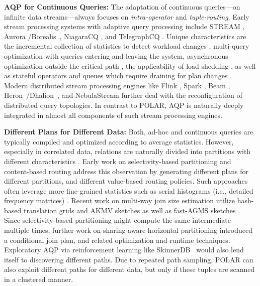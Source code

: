 \textbf{AQP for Continuous Queries:} The adaptation of continuous queries---on infinite data streams---always focuses on \emph{intra-operator} and \emph{tuple-routing}. Early stream processing systems with adaptive query processing include STREAM \cite{BabuW04}, Aurora \cite{AbadiCCCCLSTZ03}/Borealis~\cite{AbadiABCCHLMRRTXZ05}, NiagaraCQ \cite{ChenJDTW00}, and TelegraphCQ \cite{ChandrasekaranDFHHKMRRS03}. Unique characteristics are the incremental collection of statistics to detect workload changes \cite{BabuMMNW04}, multi-query optimization with queries entering and leaving the system, asynchronous optimization outside the critical path \cite{Boehm2011}, the applicability of load shedding \cite{TatbulCZCS03}, as well as stateful operators and queues which require draining for plan changes \cite{WangFMWZ19}. Modern distributed stream processing engines like Flink \cite{AlexandrovBEFHHKLLMNPRSSHTW14}, Spark \cite{ZahariaDLHSS13}, Beam \cite{AkidauBCCFLMMPS15}, Heron~\cite{KulkarniBFKKMPR15}/Dhalion~\cite{FloratouAGRR17}, and NebulaStream \cite{ZeuchCMGGGBTM20} further deal with the reconfiguration of distributed query topologies. In contrast to POLAR, AQP is naturally deeply integrated in almost all components of such stream processing engines.

\textbf{Different Plans for Different Data:} Both, ad-hoc and continuous queries are typically compiled and optimized according to average statistics. However, especially in correlated data, relations are naturally divided into partitions with different characteristics \cite{TzoumasDJ10}. Early work on selectivity-based partitioning \cite{Polyzotis05} and content-based routing \cite{BizarroBDW05} address this observation by generating different plans for different partitions, and different value-based routing policies. Such approaches often leverage more fine-grained statistics such as serial histograms (i.e., detailed frequency matrices) \cite{Ioannidis93}. Recent work on multi-way join size estimation \cite{MullerM22,IzenovDRS21} utilize hash-based translation grids \cite{MullerM22} and AKMV sketches \cite{BeyerHRSG07} as well as fast-AGMS sketches \cite{IzenovDRS21}. Since selectivity-based partitioning might compute the same intermediate multiple times, further work on sharing-aware horizontal partitioning \cite{TzoumasDJ10} introduced a conditional join plan, and related optimization and runtime techniques. Exploratory AQP via reinforcement learning like SkinnerDB~\cite{TrummerWMMJA19} would also lend itself to discovering different paths. Due to repeated path sampling, POLAR can also exploit different paths for different data, but only if these tuples are scanned in a clustered manner.

